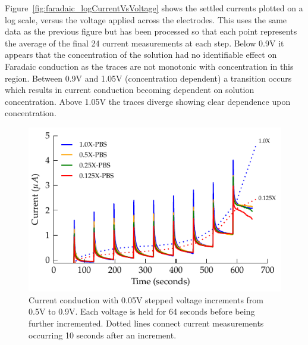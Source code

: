 \documentclass[journal, a4paper]{IEEEtran}
\begin{document}
{Figure~\ref{fig:faradaic_logCurrentVsVoltage} shows the settled currents plotted on a log scale, versus the voltage applied across the electrodes. This uses the same data as the previous figure but has been processed so that each point represents the average of the final 24 current measurements at each step. Below 0.9\thinspace V it appears that the concentration of the solution had no identifiable effect on Faradaic conduction as the traces are not monotonic with concentration in this region.  Between 0.9\thinspace V and 1.05\thinspace V (concentration dependent) a transition occurs which results in current conduction becoming dependent on solution concentration.
Above 1.05\thinspace V the traces diverge showing clear dependence upon concentration.

\begin{figure}
    \begin{center}
        \includegraphics{graphics/currentTimeFaradaicCPE_Stacked_IEEE}
    \end{center}
    \caption{Current conduction with 0.05\thinspace V stepped voltage increments from 0.5\thinspace V to 0.9V. Each voltage is held for 64 seconds before being further incremented. Dotted lines connect current measurements occurring 10 seconds after an increment.}
    \label{fig:StepResponse_Faradaic}
\end{figure}


}
\end{document}
